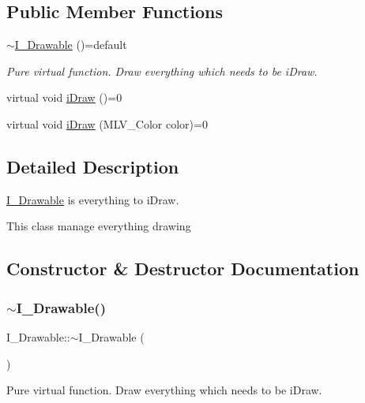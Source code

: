 \subsection*{Public Member Functions}
\begin{DoxyCompactItemize}
\item 
\hyperlink{classI__Drawable_a80bfc9f76ccdded97cbcf446d4ace774}{$\sim$\+I\+\_\+\+Drawable} ()=default
\begin{DoxyCompactList}\small\item\em Pure virtual function. Draw everything which needs to be i\+Draw. \end{DoxyCompactList}\item 
virtual void \hyperlink{classI__Drawable_ae24c65000977a805f52ce032321cd86f}{i\+Draw} ()=0
\item 
virtual void \hyperlink{classI__Drawable_a25f6474325614c451a91f019e5fe8010}{i\+Draw} (M\+L\+V\+\_\+\+Color color)=0
\end{DoxyCompactItemize}


\subsection{Detailed Description}
\hyperlink{classI__Drawable}{I\+\_\+\+Drawable} is everything to i\+Draw. 

This class manage everything drawing 

\subsection{Constructor \& Destructor Documentation}
\mbox{\label{classI__Drawable_a80bfc9f76ccdded97cbcf446d4ace774}} 
\subsubsection{\texorpdfstring{$\sim$\+I\+\_\+\+Drawable()}{~I\_Drawable()}}
{\footnotesize\ttfamily I\+\_\+\+Drawable\+::$\sim$\+I\+\_\+\+Drawable (\begin{DoxyParamCaption}{ }\end{DoxyParamCaption})\hspace{0.3cm}{\ttfamily [default]}}



Pure virtual function. Draw everything which needs to be i\+Draw. 



